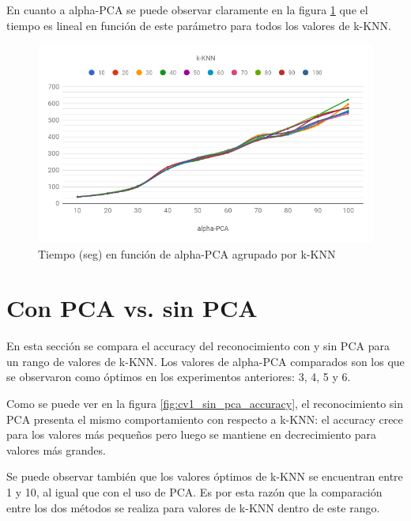 En cuanto a alpha-PCA se puede observar claramente en la figura \ref{fig:tiempo_pca} que el tiempo es lineal en función de este parámetro para todos los valores de k-KNN.

\begin{figure}[H]
    \centering
    \includegraphics[width=\textwidth]{graficos/tiempo_pca.png}
    \caption{Tiempo (seg) en función de alpha-PCA agrupado por k-KNN}
    \label{fig:tiempo_pca}
\end{figure}


\section{Con PCA vs. sin PCA}

En esta sección se compara el accuracy del reconocimiento con y sin PCA para un rango de valores de k-KNN. Los valores de alpha-PCA comparados son los que se observaron como óptimos en los experimentos anteriores: 3, 4, 5 y 6.

Como se puede ver en la figura \ref{fig:cv1_sin_pca_accuracy}, el reconocimiento sin PCA presenta el mismo comportamiento con respecto a k-KNN: el accuracy crece para los valores más pequeños pero luego se mantiene en decrecimiento para valores más grandes.

Se puede observar también que los valores óptimos de k-KNN se encuentran entre 1 y 10, al igual que con el uso de PCA. Es por esta razón que la comparación entre los dos métodos se realiza para valores de k-KNN dentro de este rango.

